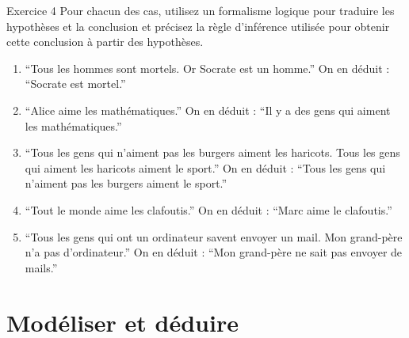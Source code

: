\documentclass[a4paper,11pt]{article}
\begin{document}
\begin{exercisebox}{Exercice 4}
Pour chacun des cas, utilisez un formalisme logique pour traduire les hypothèses et la conclusion et précisez la règle d'inférence utilisée pour obtenir cette conclusion à partir des hypothèses.

\begin{enumerate}
    \item ``Tous les hommes sont mortels. Or Socrate est un homme.'' On en déduit : ``Socrate est mortel.''
    
    \item ``Alice aime les mathématiques.'' On en déduit : ``Il y a des gens qui aiment les mathématiques.''
    
    \item ``Tous les gens qui n'aiment pas les burgers aiment les haricots. Tous les gens qui aiment les haricots aiment le sport.'' On en déduit : ``Tous les gens qui n'aiment pas les burgers aiment le sport.''
    
    \item ``Tout le monde aime les clafoutis.'' On en déduit : ``Marc aime le clafoutis.''
    
    \item ``Tous les gens qui ont un ordinateur savent envoyer un mail. Mon grand-père n'a pas d'ordinateur.'' On en déduit : ``Mon grand-père ne sait pas envoyer de mails.''
\end{enumerate}
\end{exercisebox}

\section{Modéliser et déduire}
\end{document}
